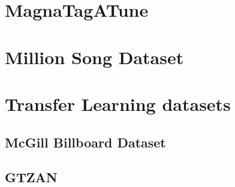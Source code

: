 \section{MagnaTagATune}

\section{Million Song Dataset}

\section{Transfer Learning datasets}

\subsection{McGill Billboard Dataset}
\subsection{GTZAN}



